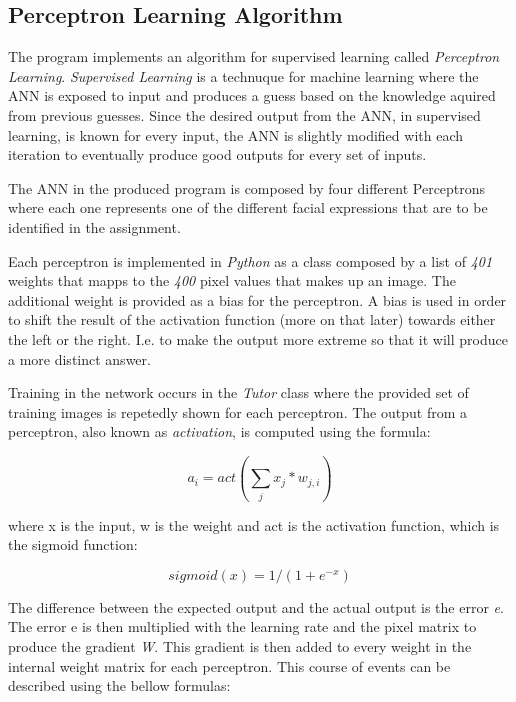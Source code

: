 \documentclass[12pt]{article}
\begin{document}
\subsection {Perceptron Learning Algorithm}
The program implements an algorithm for supervised learning called
\textit{Perceptron Learning}. \textit{Supervised Learning} is a technuque
for machine learning where the ANN is exposed to input and produces a guess
based on the knowledge aquired from previous guesses. Since the desired
output from the ANN, in supervised learning, is known for every input, the
ANN is slightly modified with each iteration to eventually produce good
outputs for every set of inputs.

The ANN in the produced program is composed by four different Perceptrons
where each one represents one of the different facial expressions that are
to be identified in the assignment.

Each perceptron is implemented in \textit{Python} as a class composed by a
list of \textit{401} weights that mapps to the \textit{400} pixel values
that makes up an image. The additional weight is provided as a bias for
the perceptron. A bias is used in order to shift the result of the activation
function (more on that later) towards either the left or the right. I.e.
to make the output more extreme so that it will produce a more distinct
answer.

Training in the network occurs in the \textit{Tutor} class where the provided
set of training images is repetedly shown for each perceptron. The output
from a perceptron, also known as \textit{activation}, is computed using
the formula:

\begin{equation*}
  a_i = act(\sum_j x_j*w_{j,i})
\end{equation*}

where x is the input, w is the weight and act is the activation function,
which is the sigmoid function:

\begin{equation*}
sigmoid(x) = 1/(1+e^{-x})
\end{equation*}


The difference between the expected output and the actual output is the
error \textit{e}. The error e is then multiplied with the learning rate \alpha
and the pixel matrix to produce the gradient \textit{\nabla W}. This
gradient is then added to every weight in the internal weight matrix for each
perceptron. This course of events can be described using the bellow formulas:
\end{document}
